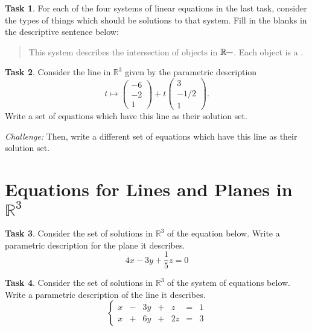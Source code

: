 \documentclass{tufte-book}
\theoremstyle{definition}
\newtheorem{task}{Task}
\begin{document}
\begin{task}
For each of the four systems of linear equations in the last task, consider the types of things which should be solutions to that system. Fill in the blanks in the descriptive sentence below:
\begin{quotation}
This system describes the intersection of \underline{\hspace{1in}} objects in $\mathbb{R}^{\underline{\hspace{.1in}}}$. Each object is a \underline{\hspace{1in}}.
\end{quotation}
\end{task}


\begin{task}
Consider the line in $\mathbb{R}^3$ given by the parametric description
\[
t \mapsto \begin{pmatrix} -6\\-2\\1 \end{pmatrix} + t \begin{pmatrix} 3\\-1/2\\1\end{pmatrix}.
\]
Write a set of equations which have this line as their solution set.

\emph{Challenge:} Then, write a different set of equations which have this line as their solution set.
\end{task}

\section*{Equations for Lines and Planes in $\mathbb{R}^3$}

\begin{task}
Consider the set of solutions in $\mathbb{R}^3$ of the equation below. Write a parametric description for the plane it describes.
\[
4x-3y+ \frac{1}{5}z = 0
\]
\end{task}


\begin{task}
Consider the set of solutions in $\mathbb{R}^3$ of the system of equations below. Write a parametric description of the line it describes.
\[
\left\{\begin{array}{rrrrrrr}
x & - & 3y & + & z & = & 1 \\
x & + & 6y & + & 2z & = & 3
\end{array}\right.
\]
\end{task}
\end{document}

